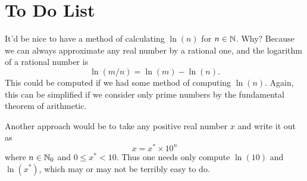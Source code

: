 \section{To Do List}

It'd be nice to have a method of calculating $\ln(n)$ for
$n\in\mathbb{N}$. Why? Because we can always approximate any real number
by a rational one, and the logarithm of a rational number is
\begin{equation}
\ln(m/n)=\ln(m)-\ln(n).
\end{equation}
This could be computed if we had some method of computing
$\ln(n)$. Again, this can be simplified if we consider only prime
numbers by the fundamental theorem of arithmetic.

Another approach would be to take any positive real number $x$
and write it out as
\begin{equation}
x=x^{*}\times 10^{n}
\end{equation}
where $n\in\mathbb{N}_{0}$ and $0\leq x^{*}<10$. Thus one needs only
compute $\ln(10)$ and $\ln(x^{*})$, which may or may not be
terribly easy to do.
